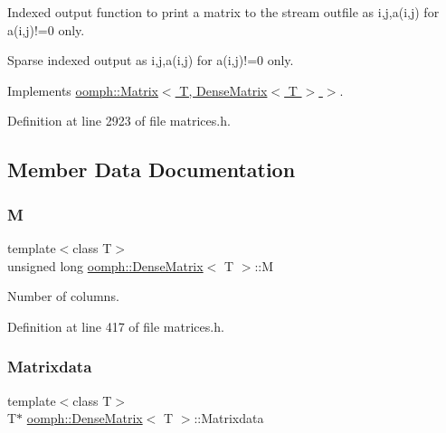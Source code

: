Indexed output function to print a matrix to the stream outfile as i,j,a(i,j) for a(i,j)!=0 only. 

Sparse indexed output as i,j,a(i,j) for a(i,j)!=0 only. 

Implements \hyperlink{classoomph_1_1Matrix_a7a5b44e7688ce2c2f7552da104e615c8}{oomph\+::\+Matrix$<$ T, Dense\+Matrix$<$ T $>$ $>$}.



Definition at line 2923 of file matrices.\+h.



\subsection{Member Data Documentation}
\mbox{\label{classoomph_1_1DenseMatrix_aa36631ee95fe55afe697377b03d05d6a}} 
\subsubsection{\texorpdfstring{M}{M}}
{\footnotesize\ttfamily template$<$class T$>$ \\
unsigned long \hyperlink{classoomph_1_1DenseMatrix}{oomph\+::\+Dense\+Matrix}$<$ T $>$\+::M\hspace{0.3cm}{\ttfamily [protected]}}



Number of columns. 



Definition at line 417 of file matrices.\+h.

\mbox{\label{classoomph_1_1DenseMatrix_a92a2eea603a42e22fd4d3ea0a258e6f8}} 
\subsubsection{\texorpdfstring{Matrixdata}{Matrixdata}}
{\footnotesize\ttfamily template$<$class T$>$ \\
T$\ast$ \hyperlink{classoomph_1_1DenseMatrix}{oomph\+::\+Dense\+Matrix}$<$ T $>$\+::Matrixdata\hspace{0.3cm}{\ttfamily [protected]}}



